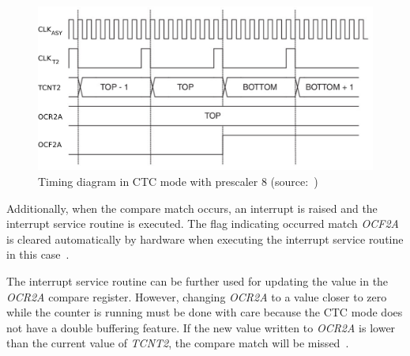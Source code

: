 \begin{figure}
  \centering
  \includegraphics[width=12cm,keepaspectratio]{fig/timing-diagram.pdf}
  \caption{Timing diagram in CTC mode with prescaler 8 (source:~\cite{avr-datasheet})}
  \label{fig:design-timing-diagram}
\end{figure}

Additionally, when the compare match occurs,
an interrupt is raised and the interrupt service routine is executed.
The flag indicating occurred match {\it{OCF2A}} is
cleared automatically by hardware when executing
the interrupt service routine in this case~\cite{avr-datasheet}.

The interrupt service routine can be further used for updating the value in the {\it{OCR2A}} compare register.
However, changing {\it{OCR2A}} to a value closer to zero while the counter is running
must be done with care because the CTC mode does not have a double buffering feature.
If the new value written to {\it{OCR2A}} is lower than the current
value of {\it{TCNT2}}, the compare match will be missed~\cite{avr-datasheet}.
